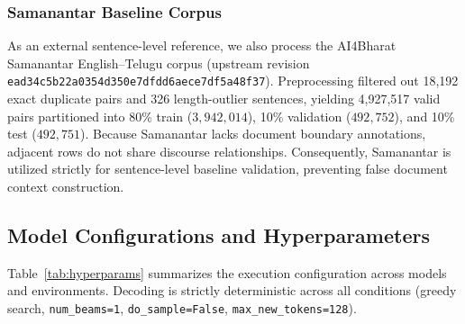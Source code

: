 \documentclass[conference]{IEEEtran}
\begin{document}
\subsubsection{Samanantar Baseline Corpus}
As an external sentence-level reference, we also process the AI4Bharat Samanantar English--Telugu corpus \cite{ramesh-etal-2022-samanantar} (upstream revision \texttt{ead34c5b22a0354d350e7dfdd6aece7df5a48f37}). Preprocessing filtered out 18,192 exact duplicate pairs and 326 length-outlier sentences, yielding 4,927,517 valid pairs partitioned into 80\% train ($3,942,014$), 10\% validation ($492,752$), and 10\% test ($492,751$). Because Samanantar lacks document boundary annotations, adjacent rows do not share discourse relationships. Consequently, Samanantar is utilized strictly for sentence-level baseline validation, preventing false document context construction.

\subsection{Model Configurations and Hyperparameters}
Table~\ref{tab:hyperparams} summarizes the execution configuration across models and environments. Decoding is strictly deterministic across all conditions (greedy search, \texttt{num\_beams=1}, \texttt{do\_sample=False}, \texttt{max\_new\_tokens=128}).
\end{document}
